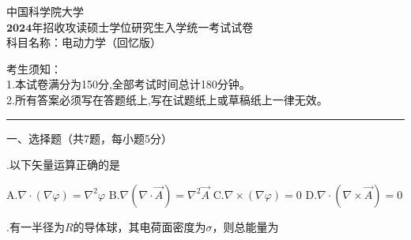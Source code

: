 \begin{center}
	\heiti
	\LARGE{ 中国科学院大学\\ $\boldsymbol{2024}$年招收攻读硕士学位研究生入学统一考试试卷\\
	科目名称：电动力学（回忆版）}

\end{center}
\noindent
考生须知：\\
1.本试卷满分为150分,全部考试时间总计180分钟。\\
2.所有答案必须写在答题纸上,写在试题纸上或草稿纸上一律无效。

\vspace*{2ex}
\hrule
\vspace*{4ex}


\setcounter{page}{1}%
\pagestyle{mypagestyle}

\onehalfspacing
\vspace{0.4cm}

\noindent
一、选择题（共7题，每小题5分）
\vspace{0.2cm}

.\hspace{0.8em}以下矢量运算正确的是
\vspace{0.2cm}

A.\hspace{0.8em}$\nabla \cdot (\nabla \varphi) = \nabla ^2 \varphi $ \hspace{2em}
B.\hspace{0.8em}$\nabla( \nabla \cdot \Vec{A}) = \nabla ^2 \Vec{A} $\hspace{2em}
C.\hspace{0.8em}$\nabla \times (\nabla \varphi) = 0 $\hspace{2em}
D.\hspace{0.8em}$\nabla \cdot (\nabla \times \Vec{A}) = 0 $
\vspace{0.2cm}

.\hspace{0.8em}有一半径为$R$的导体球，其电荷面密度为$\sigma$，则总能量为
\vspace{0.3cm}

